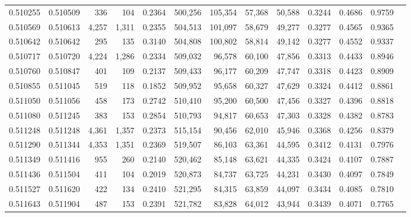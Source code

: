 \begin{tabular}{rrrrrrrrrrrrr}
0.510255 & 0.510509 &   336 &   104 &                                     0.2364 & 500,256 & 105,354 &  57,368 &  50,588 & 0.3244 & 0.4686 & 0.9759 \\
0.510569 & 0.510613 & 4,257 & 1,311 &                                     0.2355 & 504,513 & 101,097 &  58,679 &  49,277 & 0.3277 & 0.4565 & 0.9365 \\
0.510642 & 0.510642 &   295 &   135 &                                     0.3140 & 504,808 & 100,802 &  58,814 &  49,142 & 0.3277 & 0.4552 & 0.9337 \\
0.510717 & 0.510720 & 4,224 & 1,286 &                                     0.2334 & 509,032 &  96,578 &  60,100 &  47,856 & 0.3313 & 0.4433 & 0.8946 \\
0.510760 & 0.510847 &   401 &   109 &                                     0.2137 & 509,433 &  96,177 &  60,209 &  47,747 & 0.3318 & 0.4423 & 0.8909 \\
0.510855 & 0.511045 &   519 &   118 &                                     0.1852 & 509,952 &  95,658 &  60,327 &  47,629 & 0.3324 & 0.4412 & 0.8861 \\
0.511050 & 0.511056 &   458 &   173 &                                     0.2742 & 510,410 &  95,200 &  60,500 &  47,456 & 0.3327 & 0.4396 & 0.8818 \\
0.511080 & 0.511245 &   383 &   153 &                                     0.2854 & 510,793 &  94,817 &  60,653 &  47,303 & 0.3328 & 0.4382 & 0.8783 \\
0.511248 & 0.511248 & 4,361 & 1,357 &                                     0.2373 & 515,154 &  90,456 &  62,010 &  45,946 & 0.3368 & 0.4256 & 0.8379 \\
0.511290 & 0.511344 & 4,353 & 1,351 &                                     0.2369 & 519,507 &  86,103 &  63,361 &  44,595 & 0.3412 & 0.4131 & 0.7976 \\
0.511349 & 0.511416 &   955 &   260 &                                     0.2140 & 520,462 &  85,148 &  63,621 &  44,335 & 0.3424 & 0.4107 & 0.7887 \\
0.511436 & 0.511504 &   411 &   104 &                                     0.2019 & 520,873 &  84,737 &  63,725 &  44,231 & 0.3430 & 0.4097 & 0.7849 \\
0.511527 & 0.511620 &   422 &   134 &                                     0.2410 & 521,295 &  84,315 &  63,859 &  44,097 & 0.3434 & 0.4085 & 0.7810 \\
0.511643 & 0.511904 &   487 &   153 &                                     0.2391 & 521,782 &  83,828 &  64,012 &  43,944 & 0.3439 & 0.4071 & 0.7765 \\

\end{tabular}
